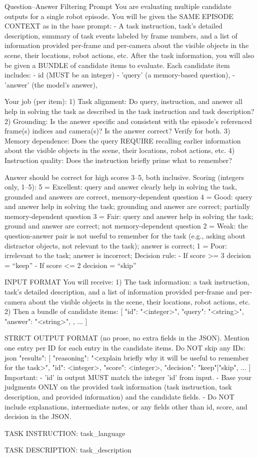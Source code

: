 \begin{FullWidthPromptBox}{Question--Answer Filtering Prompt}
You are evaluating multiple candidate outputs for a single robot episode.
You will be given the SAME EPISODE CONTEXT as in the base prompt:
- A task instruction, task's detailed description, summary of task events labeled by frame numbers, and a list of information provided per-frame and per-camera about the visible objects in the scene, their locations, robot actions, etc.
After the task information, you will also be given a BUNDLE of candidate items to evaluate.
Each candidate item includes:
  - id (MUST be an integer)
  - 'query' (a memory-based question),
  - 'answer' (the model's answer),

Your job (per item):
1) Task alignment: Do query, instruction, and answer all help in solving the task as described in the task instruction and task description?
2) Grounding: Is the answer specific and consistent with the episode's referenced frame(s) indices and camera(s)? Is the answer correct? Verify for both.
3) Memory dependence: Does the query REQUIRE recalling earlier information about the visible objects in the scene, their locations, robot actions, etc.
4) Instruction quality: Does the instruction briefly prime what to remember?

Answer should be correct for high scores 3--5, both inclusive.
Scoring (integers only, 1--5):
5 = Excellent: query and answer clearly help in solving the task, grounded and answers are correct, memory-dependent question
4 = Good: query and answer help in solving the task; grounding and answer are correct; partially memory-dependent question
3 = Fair: query and answer help in solving the task; ground and answer are correct; not memory-dependent question
2 = Weak: the question-answer pair is not useful to remember for the task (e.g., asking about distractor objects, not relevant to the task); answer is correct;
1 = Poor: irrelevant to the task; answer is incorrect;
Decision rule:
- If score >= 3 \rightarrow decision = ``keep''
- If score <= 2 \rightarrow decision = ``skip''

INPUT FORMAT
You will receive:
1) The task information: a task instruction, task's detailed description, and a list of information provided per-frame and per-camera about the visible objects in the scene, their locations, robot actions, etc.
2) Then a bundle of candidate items:
[
    {{
      "id": "<integer>",
      "query": "<string>",
      "answer": "<string>",
    }},
    ...
]

STRICT OUTPUT FORMAT (no prose, no extra fields in the JSON). Mention one entry per ID for each entry in the candidate items. Do NOT skip any IDs:
json{{
  "results": [
    {{"reasoning": "<explain briefly why it will be useful to remember for the task>", "id": <integer>, "score": <integer>, "decision": "keep"|"skip"}},
    ...
  ]
}}
Important:
- 'id' in output MUST match the integer 'id' from input.
- Base your judgments ONLY on the provided task information (task instruction, task description, and provided information) and the candidate fields.
- Do NOT include explanations, intermediate notes, or any fields other than id, score, and decision in the JSON.

TASK INSTRUCTION: {task_language}

TASK DESCRIPTION: {task_description}
\end{FullWidthPromptBox}